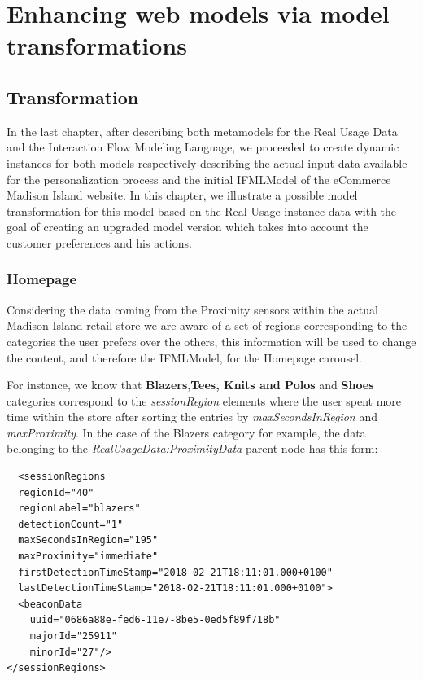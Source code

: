 \chead{}

\chapter{Enhancing web models via model transformations}
\label{enhancing-web-models-via-model-transformations}

\section{Transformation}

In the last chapter, after describing both metamodels for the Real Usage Data and the Interaction Flow Modeling Language,  we proceeded to create dynamic instances for both models respectively describing the actual input data available for the personalization process and the initial IFMLModel of the eCommerce Madison Island website. In this chapter, we illustrate a possible model transformation for this model based on the Real Usage instance data with the goal of creating an upgraded model version which takes into account the customer preferences and his actions.

\subsection{Homepage}
\label{homepage-updates}
Considering the data coming from the Proximity sensors within the actual Madison Island retail store we are aware of a set of regions corresponding to the categories the user prefers over the others, this information will be used to change the content, and therefore the IFMLModel, for the Homepage carousel.

For instance, we know that \textbf{Blazers},\textbf{Tees, Knits and Polos} and \textbf{Shoes} categories correspond to the \textit{sessionRegion} elements where the user spent more time within the store after sorting the entries by \textit{maxSecondsInRegion} and \textit{maxProximity}. In the case of the Blazers category for example, the data belonging to the \textit{RealUsageData:ProximityData} parent node has this form:

\vspace{0.5cm}
\lstset{language=XML}
\begin{lstlisting} 
  <sessionRegions
  regionId="40"
  regionLabel="blazers"
  detectionCount="1"
  maxSecondsInRegion="195"
  maxProximity="immediate"
  firstDetectionTimeStamp="2018-02-21T18:11:01.000+0100"
  lastDetectionTimeStamp="2018-02-21T18:11:01.000+0100">
  <beaconData
    uuid="0686a88e-fed6-11e7-8be5-0ed5f89f718b"
    majorId="25911"
    minorId="27"/>
</sessionRegions>
\end{lstlisting}
\vspace{0.5cm}

